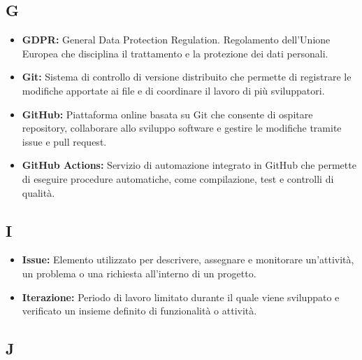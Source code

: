 
{}
\subsection*{G}

\begin{itemize}
    \item \textbf{GDPR:} General Data Protection Regulation. Regolamento dell'Unione Europea che disciplina il trattamento e la protezione dei dati personali.
    \item \textbf{Git:} Sistema di controllo di versione distribuito che permette di registrare le modifiche apportate ai file e di coordinare il lavoro di più sviluppatori.
    \item \textbf{GitHub:} Piattaforma online basata su Git che consente di ospitare repository, collaborare allo sviluppo software e gestire le modifiche tramite issue e pull request.
    \item \textbf{GitHub Actions:} Servizio di automazione integrato in GitHub che permette di eseguire procedure automatiche, come compilazione, test e controlli di qualità.
\end{itemize}


{}
\subsection*{I}

\begin{itemize}
    \item \textbf{Issue:} Elemento utilizzato per descrivere, assegnare e monitorare un'attività, un problema o una richiesta all'interno di un progetto.
    \item \textbf{Iterazione:} Periodo di lavoro limitato durante il quale viene sviluppato e verificato un insieme definito di funzionalità o attività.
\end{itemize}


{}
\subsection*{J}

